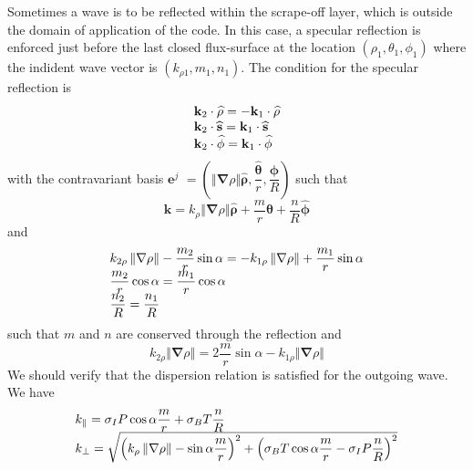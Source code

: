 \documentclass[a4paper,12pt]{article}%
\begin{document}
Sometimes a wave is to be reflected within the scrape-off layer, which is
outside the domain of application of the code. In this case, a specular
reflection is enforced just before the last closed flux-surface at the
location $\left(  \rho_{1},\theta_{1},\phi_{1}\right)  $ where the indident
wave vector is $\left(  k_{\rho1},m_{1},n_{1}\right)  $. The condition for the
specular reflection is
\begin{equation}%
\begin{array}
[c]{l}%
\mathbf{k}_{2}\cdot\widehat{\mathbf{\rho}}=-\mathbf{k}_{1}\cdot\widehat
{\mathbf{\rho}}\\
\mathbf{k}_{2}\cdot\widehat{\mathbf{s}}=\mathbf{k}_{1}\cdot\widehat
{\mathbf{s}}\\
\mathbf{k}_{2}\cdot\widehat{\mathbf{\phi}}=\mathbf{k}_{1}\cdot\widehat
{\mathbf{\phi}}%
\end{array}
\end{equation}
with the contravariant basis $\mathbf{e}^{j}$ $=\left(  \left\Vert
\mathbf{\nabla}\rho\right\Vert \widehat{\mathbf{\rho}},\dfrac{\widehat
{\mathbf{\theta}}}{r},\dfrac{\widehat{\mathbf{\phi}}}{R}\right)  $ such that%
\begin{equation}
\mathbf{k}=k_{\rho}\left\Vert \mathbf{\nabla}\rho\right\Vert \widehat
{\mathbf{\rho}}+\dfrac{m}{r}\widehat{\mathbf{\theta}}+\dfrac{n}{R}%
\widehat{\mathbf{\phi}}%
\end{equation}
and
\begin{equation}%
\begin{array}
[c]{l}%
k_{2\rho}\left\Vert \mathbf{\nabla}\rho\right\Vert -\dfrac{m_{2}}{r}\sin
\alpha=-k_{1\rho}\left\Vert \mathbf{\nabla}\rho\right\Vert +\dfrac{m_{1}}%
{r}\sin\alpha\\
\dfrac{m_{2}}{r}\cos\alpha=\dfrac{m_{1}}{r}\cos\alpha\\
\dfrac{n_{2}}{R}=\dfrac{n_{1}}{R}%
\end{array}
\end{equation}
such that $m$ and $n$ are conserved through the reflection and%
\begin{equation}
k_{2\rho}\left\Vert \mathbf{\nabla}\rho\right\Vert =2\dfrac{m}{r}\sin
\alpha-k_{1\rho}\left\Vert \mathbf{\nabla}\rho\right\Vert
\end{equation}
We should verify that the dispersion relation is satisfied for the outgoing
wave. We have%
\begin{equation}%
\begin{array}
[c]{l}%
k_{\Vert}=\sigma_{I}P\cos\alpha\dfrac{m}{r}+\sigma_{B}T\dfrac{n}{R}\\
k_{\bot}=\sqrt{\left(  k_{\rho}\left\Vert \mathbf{\nabla}\rho\right\Vert
-\sin\alpha\dfrac{m}{r}\right)  ^{2}+\left(  \sigma_{B}T\cos\alpha\dfrac{m}%
{r}-\sigma_{I}P\dfrac{n}{R}\right)  ^{2}}%
\end{array}
\end{equation}
\end{document}
